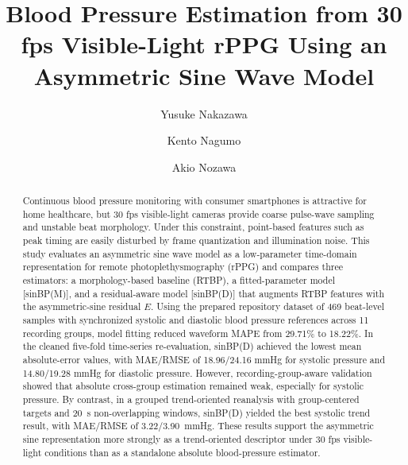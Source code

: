 \documentclass[twocolumn]{svjour3}
\begin{document}
\title{Blood Pressure Estimation from 30 fps Visible-Light rPPG Using an Asymmetric Sine Wave Model}

\author{Yusuke Nakazawa \and Kento Nagumo \and Akio Nozawa}


\date{}

\maketitle

\begin{abstract}
Continuous blood pressure monitoring with consumer smartphones is attractive for home healthcare, but 30 fps visible-light cameras provide coarse pulse-wave sampling and unstable beat morphology. Under this constraint, point-based features such as peak timing are easily disturbed by frame quantization and illumination noise. This study evaluates an asymmetric sine wave model as a low-parameter time-domain representation for remote photoplethysmography (rPPG) and compares three estimators: a morphology-based baseline (RTBP), a fitted-parameter model [sinBP(M)], and a residual-aware model [sinBP(D)] that augments RTBP features with the asymmetric-sine residual $E$. Using the prepared repository dataset of 469 beat-level samples with synchronized systolic and diastolic blood pressure references across 11 recording groups, model fitting reduced waveform MAPE from 29.71\% to 18.22\%. In the cleaned five-fold time-series re-evaluation, sinBP(D) achieved the lowest mean absolute-error values, with MAE/RMSE of 18.96/24.16 mmHg for systolic pressure and 14.80/19.28 mmHg for diastolic pressure. However, recording-group-aware validation showed that absolute cross-group estimation remained weak, especially for systolic pressure. By contrast, in a grouped trend-oriented reanalysis with group-centered targets and 20~s non-overlapping windows, sinBP(D) yielded the best systolic trend result, with MAE/RMSE of 3.22/3.90~mmHg. These results support the asymmetric sine representation more strongly as a trend-oriented descriptor under 30 fps visible-light conditions than as a standalone absolute blood-pressure estimator.
\end{abstract}
\end{document}
